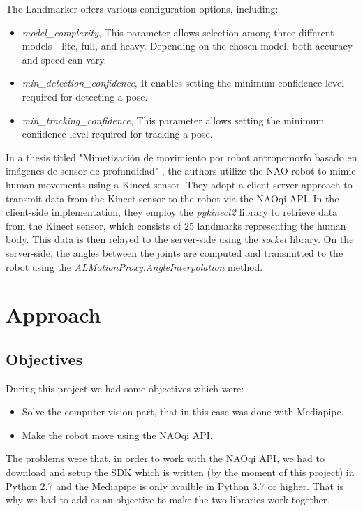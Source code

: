\documentclass[conference]{IEEEtran}
\begin{document}
The Landmarker offers various configuration options, including:

\begin{itemize}
\item \textit{model\_complexity}, This parameter allows selection among three different models - lite, full, and heavy. Depending on the chosen model, both accuracy and speed can vary.
\item \textit{min\_detection\_confidence}, It enables setting the minimum confidence level required for detecting a pose.
\item \textit{min\_tracking\_confidence}, This parameter allows setting the minimum confidence level required for tracking a pose.
\end{itemize}

In a thesis titled "Mimetización de movimiento por robot antropomorfo basado en imágenes de sensor de profundidad" \cite{b3}, the authors utilize the NAO robot to mimic human movements using a Kinect sensor. They adopt a client-server approach to transmit data from the Kinect sensor to the robot via the NAOqi API. In the client-side implementation, they employ the \textit{pykinect2} library to retrieve data from the Kinect sensor, which consists of 25 landmarks representing the human body. This data is then relayed to the server-side using the \textit{socket} library. On the server-side, the angles between the joints are computed and transmitted to the robot using the \textit{ALMotionProxy.AngleInterpolation} method.


\section{Approach}

\subsection{Objectives}

During this project we had some objectives which were:
\begin{itemize}
\item Solve the computer vision part, that in this case was done with Mediapipe.
\item Make the robot move using the NAOqi API.

\end{itemize}
The problems were that, in order to work with the NAOqi API, we had to download and setup the SDK which is written (by the moment of this project) in Python 2.7 and the Mediapipe is only availble in Python 3.7 or higher. That is why we had to add as an objective to make the two libraries work together.
\end{document}
